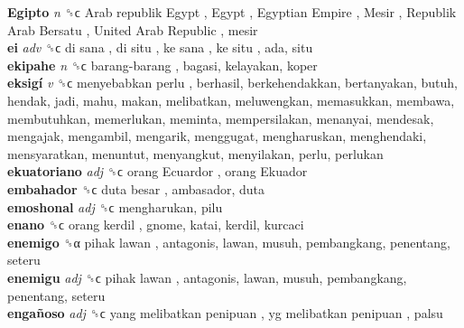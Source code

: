 \textbf{Egipto} \emph{n}  ␝ϲ   Arab republik Egypt ,  Egypt ,  Egyptian Empire ,  Mesir ,  Republik Arab Bersatu ,  United Arab Republic , mesir  \\
\textbf{ei} \emph{adv}  ␝ϲ   di sana ,  di situ ,  ke sana ,  ke situ , ada, situ  \\
\textbf{ekipahe} \emph{n}  ␝ϲ   barang-barang , bagasi, kelayakan, koper  \\
\textbf{eksigí} \emph{v}  ␝ϲ   menyebabkan perlu , berhasil, berkehendakkan, bertanyakan, butuh, hendak, jadi, mahu, makan, melibatkan, meluwengkan, memasukkan, membawa, membutuhkan, memerlukan, meminta, mempersilakan, menanyai, mendesak, mengajak, mengambil, mengarik, menggugat, mengharuskan, menghendaki, mensyaratkan, menuntut, menyangkut, menyilakan, perlu, perlukan  \\
\textbf{ekuatoriano} \emph{adj}  ␝ϲ   orang Ecuardor ,  orang Ekuador   \\
\textbf{embahador} ␝ϲ   duta besar , ambasador, duta  \\
\textbf{emoshonal} \emph{adj}  ␝ϲ  mengharukan, pilu  \\
\textbf{enano} ␝ϲ   orang kerdil , gnome, katai, kerdil, kurcaci  \\
\textbf{enemigo} ␝α   pihak lawan , antagonis, lawan, musuh, pembangkang, penentang, seteru  \\
\textbf{enemigu} \emph{adj}  ␝ϲ   pihak lawan , antagonis, lawan, musuh, pembangkang, penentang, seteru  \\
\textbf{engañoso} \emph{adj}  ␝ϲ   yang melibatkan penipuan ,  yg melibatkan penipuan , palsu  \\
